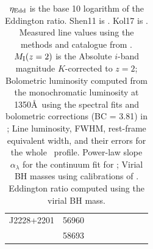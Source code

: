 \documentclass[a4paper,fleqn,usenatbib]{mnras}
\begin{document}
\begin{table}
\begin{tabular}{l l  ll ll cc r}
J2228+2201               & 56960                          &                                       &                                                &                              &                               &                 &                                        & \\
                                  & 58693                          &                                       &                                               &                               &                                &                &                   &  \\
    \hline
    \hline
  \end{tabular}
  \caption{$\eta_{\rm Edd}$ is the base 10 logarithm of the Eddington ratio.
        Shen11 is \citet{Shen2011}. 
        Kol17 is \citet{Kozlowski2017}.
        Measured line values using the methods and catalogue from
\citet{Shen2011}.  $M_{\rm I}(z=2)$ is the Absolute $i$-band magnitude
$K$-corrected to $z = 2$; Bolometric luminosity computed from the
monochromatic luminosity at 1350\AA\ using the spectral fits and
bolometric corrections (BC = 3.81) in \citet{Richards2006b}; Line
luminosity, FWHM, rest-frame equivalent width, and their errors for
the whole \civ\ profile.  Power-law slope $\alpha_{\lambda}$ for the
continuum fit for \civ; Virial BH masses using calibrations of
\citet{VestergaardPeterson2006}.  Eddington ratio computed using the
virial BH mass.}
\label{tab:Eddington_ratios} 
\end{table}
\end{document}
